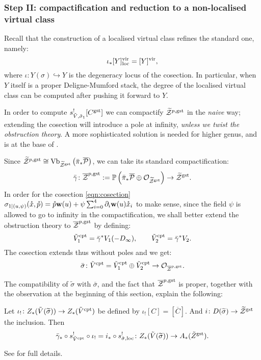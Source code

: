 \subsubsection{Step II: compactification and reduction to a non-localised virtual class}
Recall that the construction of a localised virtual class refines the standard one, namely:
\[\iota_*\virloc{Y}=\virt{Y},\]
where $\iota\colon Y(\sigma)\hookrightarrow Y$ is the degeneracy locus of the cosection. In particular, when $Y$ itself is a proper Deligne-Mumford stack, the degree of the localised virtual class can be computed after pushing it forward to $Y$.

In order to compute $s^!_{\tilde V,\tilde\sigma_1}[C^{\rm{gst}}]$ we can compactify $\tZ^{p,\rm{gst}}$ in the \emph{naive} way; extending the cosection will introduce a pole at infinity, \emph{unless we twist the obstruction theory}. A more sophisticated solution is needed for higher genus, and is at the base of \cite{CJRS}.

Since $\tZ^{p,\rm{gst}}\cong\operatorname{Vb}_{\tZ^{\rm{gst}}}\left(\bar{\pi}_*\overline{\mathcal P}\right)$, we can take its standard compactification:
\[\bar{\gamma}\colon \overline{\mathcal Z}^{p,\rm{gst}}:=\PP\left(\bar{\pi}_*\overline{\mathcal P}\oplus \OO_{\tZ^{\rm{gst}}}\right)\to \tZ^{\rm{gst}}.\]
In order for the cosection \eqref{eqn:cosection}
$\sigma_{1|(u,\psi)}(\mathring{x},\mathring{p})=\mathring{p}\w(u)+\psi\sum_{i=0}^4\partial_i\w(u)\mathring{x}_i$
to make sense, since the field $\psi$ is allowed to go to infinity in the compactification, we shall better extend the obstruction theory to $\oZp$ by defining:
\[\tilde{V}^{\rm{cpt}}_1=\bar{\gamma}^*V_1(-D_{\infty}),\qquad \tilde{V}^{\rm{cpt}}_2=\bar{\gamma}^*V_2.\]
The cosection extends thus without poles and we get:
\[\bar{\sigma}\colon \tilde{V}^{\rm{cpt}}=\tilde{V}^{\rm{cpt}}_1\oplus \tilde{V}^{\rm{cpt}}_2\to\OO_{\oZp}. \]
 
 The compatibility of $\tilde\sigma$ with $\bar\sigma$, and the fact that $\oZp$ is proper, together with the observation at the beginning of this section, explain the following:
 \begin{prop}
 Let $\iota_{!}\colon Z_*(\tilde{V}(\widetilde{\sigma}))\to Z_*(\tilde{V}^{\rm{cpt}})$ be defined by 
 $\iota_{!}[C]=[\overline{C}].$ And $i\colon D(\widetilde{\sigma})\to \tZ^{\rm{gst}}$ the inclusion. Then
 \[\bar{\gamma}_*\circ s^{!}_{\tilde{V}^{\rm{cpt}}}\circ\iota_{!}=i_*\circ s^{!}_{\tilde\sigma,\rm{loc}}\colon  Z_*(\tilde{V}(\widetilde{\sigma}))\to A_*(\tilde{Z}^{\rm{gst}}).\]
 \end{prop}
 See \cite[Proposition~6.4]{CL} for full details.
 
